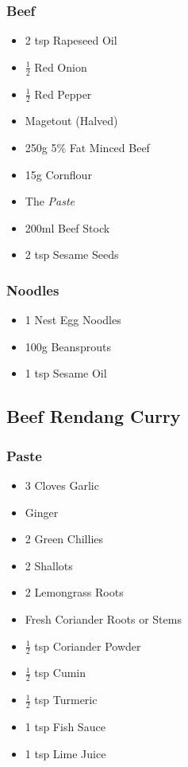 \documentclass[11pt, english]{article}
\begin{document}
		\subsubsection*{Beef}

	\begin{itemize}
        \setlength\itemsep{0cm}
                \item 2 tsp Rapeseed Oil
		\item $\frac{1}{2}$ Red Onion
		\item $\frac{1}{2}$ Red Pepper
		\item Magetout (Halved)
		\item 250g 5\% Fat Minced Beef
		\item 15g Cornflour
		\item The \textit{Paste}
		\item 200ml Beef Stock
		\item 2 tsp Sesame Seeds
        \end{itemize}

		\subsubsection*{Noodles}

	\begin{itemize}
        \setlength\itemsep{0cm}
                \item 1 Nest Egg Noodles
		\item 100g Beansprouts
		\item 1 tsp Sesame Oil
        \end{itemize}

\newpage

	\subsection{Beef Rendang Curry}

		\subsubsection*{Paste}

	\begin{itemize}
	\setlength\itemsep{0cm}
                \item 3 Cloves Garlic
                \item Ginger
                \item 2 Green Chillies
                \item 2 Shallots
                \item 2 Lemongrass Roots
                \item Fresh Coriander Roots or Stems
		\item $\frac{1}{2}$ tsp Coriander Powder
                \item $\frac{1}{2}$ tsp Cumin
		\item $\frac{1}{2}$ tsp Turmeric
                \item 1 tsp Fish Sauce
                \item 1 tsp Lime Juice
	\end{itemize}
\end{document}
